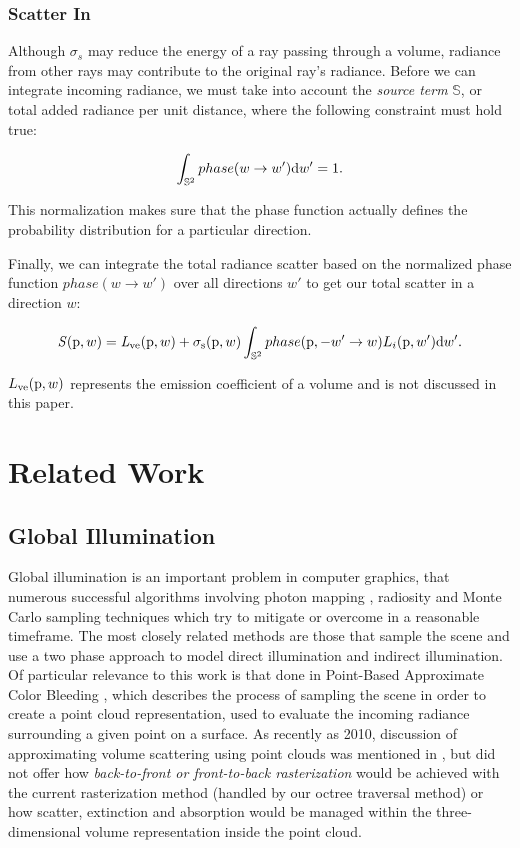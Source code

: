 \documentclass[runningheads]{llncs}
\begin{document}
\subsubsection{Scatter In}
Although $\sigma_{s}$ may reduce the energy of a ray passing through a volume, radiance from other rays may contribute to the original ray's radiance.  Before we can integrate incoming radiance, we must take into account the \textit{source term} $\mathbb{S}$, or total added radiance per unit distance, where the following constraint must hold true:

\begin{equation}
\int_{\mathbb{S}^2}phase(w \to w')\textup{d}w' = 1.
\label{source_eq}
\end{equation}

This normalization makes sure that the phase function actually defines the probability distribution for a particular direction.

Finally, we can integrate the total radiance scatter based on the normalized phase function $phase(w \to w')$ over all directions $w'$ to get our total scatter in a direction $w$:

\begin{displaymath}
\mathit{S}(\textup{p},w) = \mathit{L}_{\textup{ve}}(\textup{p},w) + \sigma_{\textup{s}}(\textup{p}, w) \int_{\mathbb{S}^2} phase(\textup{p}, -w' \to w) L_{i}(\textup{p},w')\textup{d}w'.
\end{displaymath}

$L_{\textup{ve}}(\textup{p}, w)$ represents the emission coefficient of a volume and is not discussed in this paper.


\section{Related Work}

\subsection{Global Illumination}
Global illumination is an important problem in computer graphics, that numerous successful algorithms involving photon mapping \cite{Jensen:2009}, radiosity \cite{radiosity} and Monte Carlo sampling techniques \cite{monte_carlo} which try to mitigate or overcome in a reasonable timeframe.  The most closely related methods are those that sample the scene and use a two phase approach to model direct illumination and indirect illumination. Of particular relevance to this work is that done in Point-Based Approximate Color Bleeding \cite{christensen:2008}, which describes the process of sampling the scene in order to create a point cloud representation, used to evaluate the incoming radiance surrounding a given point on a surface.  As recently as 2010, discussion of approximating volume scattering using point clouds was mentioned in \cite{christensen:siggraph}, but did not offer how \textit{back-to-front or front-to-back rasterization} would be achieved with the current rasterization method (handled by our octree traversal method) or how scatter, extinction and absorption would be managed within the three-dimensional volume representation inside the point cloud.
\end{document}
